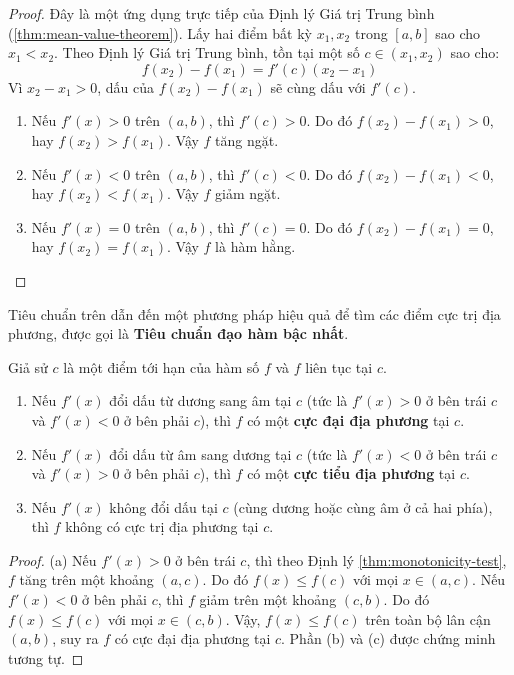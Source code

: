 \begin{proof}
Đây là một ứng dụng trực tiếp của Định lý Giá trị Trung bình (\ref{thm:mean-value-theorem}).
Lấy hai điểm bất kỳ $x_1, x_2$ trong $[a,b]$ sao cho $x_1 < x_2$. Theo Định lý Giá trị Trung bình, tồn tại một số $c \in (x_1, x_2)$ sao cho:
$$ f(x_2) - f(x_1) = f'(c)(x_2 - x_1) $$
Vì $x_2 - x_1 > 0$, dấu của $f(x_2) - f(x_1)$ sẽ cùng dấu với $f'(c)$.
\begin{enumerate}[label=(\alph*)]
    \item Nếu $f'(x) > 0$ trên $(a,b)$, thì $f'(c) > 0$. Do đó $f(x_2) - f(x_1) > 0$, hay $f(x_2) > f(x_1)$. Vậy $f$ tăng ngặt.
    \item Nếu $f'(x) < 0$ trên $(a,b)$, thì $f'(c) < 0$. Do đó $f(x_2) - f(x_1) < 0$, hay $f(x_2) < f(x_1)$. Vậy $f$ giảm ngặt.
    \item Nếu $f'(x) = 0$ trên $(a,b)$, thì $f'(c) = 0$. Do đó $f(x_2) - f(x_1) = 0$, hay $f(x_2) = f(x_1)$. Vậy $f$ là hàm hằng.
\end{enumerate}
\end{proof}

Tiêu chuẩn trên dẫn đến một phương pháp hiệu quả để tìm các điểm cực trị địa phương, được gọi là \textbf{Tiêu chuẩn đạo hàm bậc nhất}.

\begin{theorem}
\label{thm:first-derivative-test}
Giả sử $c$ là một điểm tới hạn của hàm số $f$ và $f$ liên tục tại $c$.
\begin{enumerate}[label=(\alph*)]
    \item Nếu $f'(x)$ đổi dấu từ dương sang âm tại $c$ (tức là $f'(x)>0$ ở bên trái $c$ và $f'(x)<0$ ở bên phải $c$), thì $f$ có một \textbf{cực đại địa phương} tại $c$.
    \item Nếu $f'(x)$ đổi dấu từ âm sang dương tại $c$ (tức là $f'(x)<0$ ở bên trái $c$ và $f'(x)>0$ ở bên phải $c$), thì $f$ có một \textbf{cực tiểu địa phương} tại $c$.
    \item Nếu $f'(x)$ không đổi dấu tại $c$ (cùng dương hoặc cùng âm ở cả hai phía), thì $f$ không có cực trị địa phương tại $c$.
\end{enumerate}
\end{theorem}
\begin{proof}
(a) Nếu $f'(x) > 0$ ở bên trái $c$, thì theo Định lý \ref{thm:monotonicity-test}, $f$ tăng trên một khoảng $(a,c)$. Do đó $f(x) \le f(c)$ với mọi $x \in (a,c)$. Nếu $f'(x) < 0$ ở bên phải $c$, thì $f$ giảm trên một khoảng $(c,b)$. Do đó $f(x) \le f(c)$ với mọi $x \in (c,b)$. Vậy, $f(x) \le f(c)$ trên toàn bộ lân cận $(a,b)$, suy ra $f$ có cực đại địa phương tại $c$.
Phần (b) và (c) được chứng minh tương tự.
\end{proof}

